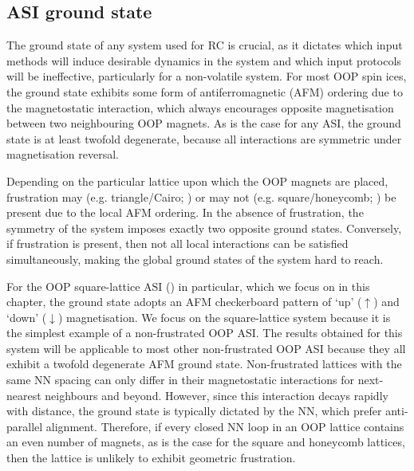 \subsection{ASI ground state} %
The ground state of any system used for RC is crucial, as it dictates which input methods will induce desirable dynamics in the system and which input protocols will be ineffective, particularly for a non-volatile system.
For most OOP spin ices, the ground state exhibits some form of antiferromagnetic (AFM) ordering due to the magnetostatic interaction, which always encourages opposite magnetisation between two neighbouring OOP magnets.
As is the case for any ASI, the ground state is at least twofold degenerate, because all interactions are symmetric under magnetisation reversal. \par
Depending on the particular lattice upon which the OOP magnets are placed, frustration may (e.g. triangle/Cairo; ) or may not (e.g. square/honeycomb; ) be present due to the local AFM ordering.
In the absence of frustration, the symmetry of the system imposes exactly two opposite ground states.
Conversely, if frustration is present, then not all local interactions can be satisfied simultaneously, making the global ground states of the system hard to reach. \par %
For the OOP square-lattice ASI () in particular, which we focus on in this chapter, the ground state adopts an AFM checkerboard pattern of `up' ($\uparrow$) and `down' ($\downarrow$) magnetisation.
We focus on the square-lattice system because it is the simplest example of a non-frustrated OOP ASI.
The results obtained for this system will be applicable to most other non-frustrated OOP ASI because they all exhibit a twofold degenerate AFM ground state.
Non-frustrated lattices with the same NN spacing can only differ in their magnetostatic interactions for next-nearest neighbours and beyond.
However, since this interaction decays rapidly with distance, the ground state is typically dictated by the NN, which prefer anti-parallel alignment.
Therefore, if every closed NN loop in an OOP lattice contains an even number of magnets, as is the case for the square and honeycomb lattices, then the lattice is unlikely to exhibit geometric frustration.

